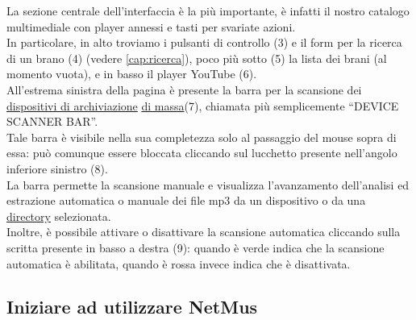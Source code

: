 La sezione centrale dell'interfaccia \`e la pi\`u importante, \`e infatti il
nostro catalogo multimediale con player annessi e tasti per svariate azioni.\\
In particolare, in alto troviamo i pulsanti di controllo (3) e il form per la
ricerca di un brano (4) (vedere \ref{cap:ricerca}), poco pi\`u sotto (5) la
lista dei brani (al momento vuota), e in basso il player YouTube (6).\\

All'estrema sinistra della pagina \`e presente la barra per la scansione
dei \underline{dispositivi di archiviazione} \underline{di massa}(7), chiamata
pi\`u semplicemente ``DEVICE SCANNER BAR''.\\ 
Tale barra \`e visibile nella sua completezza solo al passaggio del mouse sopra
di essa: pu\`o comunque essere bloccata cliccando sul lucchetto presente
nell'angolo inferiore sinistro (8).\\
La barra permette la scansione manuale e visualizza l'avanzamento dell'analisi
ed estrazione automatica o manuale dei file mp3 da un dispositivo o da una \underline{directory} selezionata.\\
Inoltre, \`e possibile attivare o disattivare la scansione automatica cliccando
sulla scritta presente in basso a destra (9): quando \`e verde indica che la
scansione automatica \`e abilitata, quando \`e rossa invece indica che \`e
disattivata.

\newpage
\subsection{Iniziare ad utilizzare NetMus}

